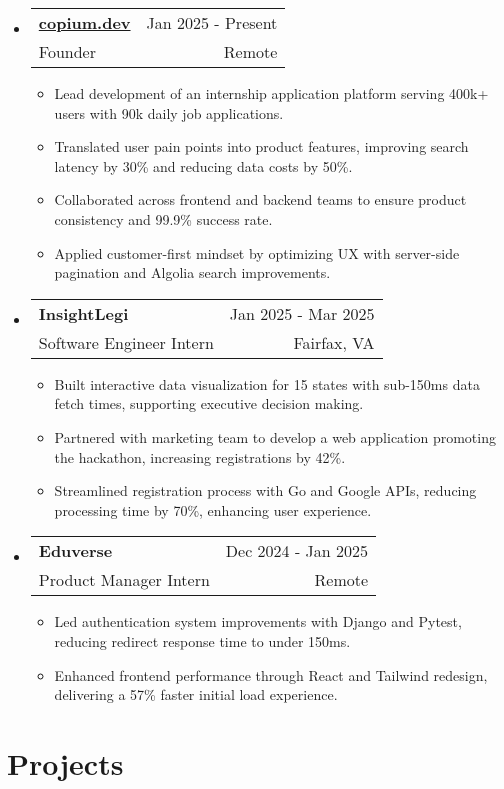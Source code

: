 \documentclass[letterpaper,11pt]{article}
\makeatletter
\newcommand{\resumeItem}[1]{
  \item{
    {#1}
  }
}
\newcommand{\resumeSubheading}[4]{
    \item
    \begin{tabular*}{0.985\textwidth}[t]{l@{\extracolsep{\fill}}r@{\hspace{-0.1in}}}
        {\textbf{#1}} & {#2} \\
        #3 &  #4 \\
    \end{tabular*}\vspace{-5pt}
}
\newcommand{\resumeSubHeadingListStart}{\begin{itemize}[leftmargin=0.00in, rightmargin=-0.2in, label={}]\vspace{3pt}}
\newcommand{\resumeSubHeadingListEnd}{\end{itemize}\vspace{-5pt}}
\newcommand{\resumeItemListStart}{\vspace{3pt}\begin{itemize}[leftmargin=0.15in, rightmargin=0.15in]}
\newcommand{\resumeItemListEnd}{\end{itemize}\vspace{-5pt}}
\makeatother
\begin{document}
\resumeSubHeadingListStart
\resumeSubheading
{\href{https://www.copium.dev}{copium.dev}} {Jan 2025 - Present}
{Founder} {Remote}
\resumeItemListStart 
\resumeItem{Lead development of an internship application platform serving 400k+ users with 90k daily job applications.}
\resumeItem{Translated user pain points into product features, improving search latency by 30\% and reducing data costs by 50\%.}
\resumeItem{Collaborated across frontend and backend teams to ensure product consistency and 99.9\% success rate.}
\resumeItem{Applied customer-first mindset by optimizing UX with server-side pagination and Algolia search improvements.}
\resumeItemListEnd
\resumeSubHeadingListEnd

\resumeSubHeadingListStart
\resumeSubheading
{InsightLegi} {Jan 2025 - Mar 2025}
{Software Engineer Intern} {Fairfax, VA}
\resumeItemListStart 
\resumeItem{Built interactive data visualization for 15 states with sub-150ms data fetch times, supporting executive decision making.}
\resumeItem{Partnered with marketing team to develop a web application promoting the hackathon, increasing registrations by 42\%.}
\resumeItem{Streamlined registration process with Go and Google APIs, reducing processing time by 70\%, enhancing user experience.}
\resumeItemListEnd
\resumeSubHeadingListEnd

\resumeSubHeadingListStart
\resumeSubheading
{Eduverse} {Dec 2024 - Jan 2025}
{Product Manager Intern} {Remote}
\resumeItemListStart
\resumeItem{Led authentication system improvements with Django and Pytest, reducing redirect response time to under 150ms.}
\resumeItem{Enhanced frontend performance through React and Tailwind redesign, delivering a 57\% faster initial load experience.}
\resumeItemListEnd
\resumeSubHeadingListEnd



\section{Projects}
\end{document}
